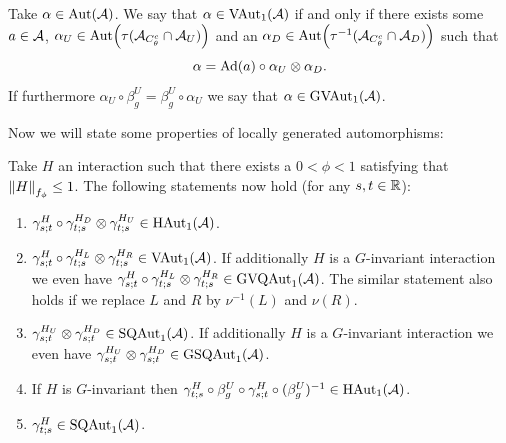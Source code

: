 \documentclass[11pt,a4paper,twoside]{article}
\numberwithin{equation}{section}
\begin{document}
	\begin{definition}
		Take $\alpha\in\Aut{\AA}$. We say that $\alpha\in\textrm{VAut}_1(\AA)$ if and only if there exists some $a\in\AA$, $\alpha_U\in\Aut{\tau(\AA_{C_\theta^c}\cap\AA_{U})}$ and an $\alpha_D\in\Aut{\tau^{-1}(\AA_{C_\theta^c}\cap\AA_{D})}$ such that
		\begin{equation}
			\alpha=\Ad{a}\circ\alpha_U\otimes\alpha_D.
		\end{equation}
		If furthermore $\alpha_U\circ\beta_g^U=\beta_g^U\circ\alpha_U$ we say that $\alpha\in\textrm{GVAut}_1(\AA)$.
	\end{definition}
	Now we will state some properties of locally generated automorphisms:
	\begin{lemma}\label{lem:PropertiesLocallyGeneratedAutomorphisms}
		Take $H$ an interaction such that there exists a $0<\phi<1$ satisfying that $\norm{H}_{f_\phi}\leq 1$. The following statements now hold (for any $s,t\in\RR$):
		\begin{enumerate}
			\item $\gamma^H_{s;t}\circ\gamma^{H_D}_{t;s}\otimes\gamma^{H_U}_{t;s}\in\textrm{HAut}_1(\AA)$.
			\item $\gamma^H_{s;t}\circ\gamma^{H_L}_{t;s}\otimes\gamma^{H_R}_{t;s}\in\textrm{VAut}_1(\AA)$. If additionally $H$ is a $G$-invariant interaction we even have $\gamma^H_{s;t}\circ\gamma^{H_L}_{t;s}\otimes\gamma^{H_R}_{t;s}\in\textrm{GVQAut}_1(\AA)$. The similar statement also holds if we replace $L$ and $R$ by $\nu^{-1}(L)$ and $\nu(R)$.
			\item $\gamma^{H_U}_{s;t}\otimes\gamma^{H_D}_{s;t}\in\textrm{SQAut}_1(\AA)$. If additionally $H$ is a $G$-invariant interaction we even have $\gamma^{H_U}_{s;t}\otimes\gamma^{H_D}_{s;t}\in\textrm{GSQAut}_1(\AA)$.
			\item If $H$ is $G$-invariant then $\gamma^{H}_{t;s}\circ\beta_g^U\circ\gamma^{H}_{s;t}\circ(\beta_g^U)^{-1}\in\textrm{HAut}_1(\AA)$.
			\item $\gamma^{H}_{t;s}\in\textrm{SQAut}_1(\AA)$.
		\end{enumerate}
	\end{lemma}
\end{document}
